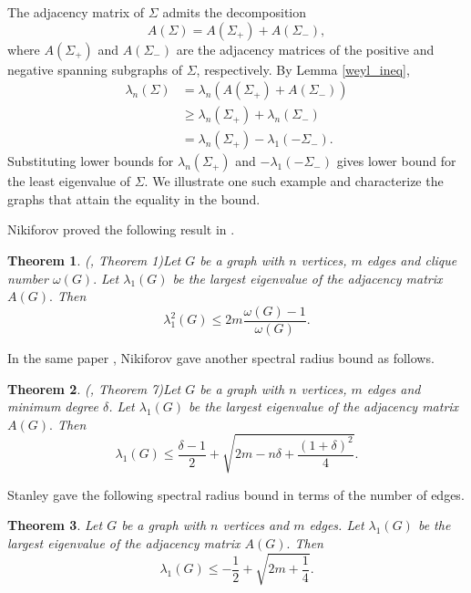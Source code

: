 \documentclass[12pt]{article}
\theoremstyle{plain}
\newtheorem{theorem}{Theorem}[section]
\numberwithin{equation}{section}
\begin{document}
	The adjacency matrix of $\Sigma$ admits the decomposition
	\[
	A(\Sigma)=A(\Sigma_{+})+A(\Sigma_{-}),
	\]
	where $A(\Sigma_{+})$ and $A(\Sigma_{-})$ are the adjacency matrices of the positive and negative spanning subgraphs of $\Sigma$, respectively.
	By Lemma \ref{weyl_ineq}, 
	\begin{align} \label{inequ_adj_one}
		\nonumber \lambda_{n}(\Sigma)&=\lambda_{n}(A(\Sigma_{+})+A(\Sigma_{-}))\\
		\nonumber   &\geq \lambda_{n}(\Sigma_{+})+\lambda_{n}(\Sigma_{-}) \\
		&= \lambda_{n}(\Sigma_{+})-\lambda_{1}(-\Sigma_{-}).
	\end{align}
	Substituting lower bounds for $\lambda_n(\Sigma_+)$ and $-\lambda_1(-\Sigma_-)$ gives lower bound for the least eigenvalue of $\Sigma$. We illustrate one such example and characterize the graphs that attain the equality in the bound.
	
	Nikiforov proved the following result in \cite{nikiforov2002some}.
	\begin{theorem}\emph{(\cite{nikiforov2002some}, Theorem 1)}\label{Niki_largest}
		Let $G$ be a graph with $n$ vertices, $m$ edges and clique number $\omega(G).$ Let $\lambda_{1}(G)$ be the largest eigenvalue of the adjacency matrix $A(G).$ Then \[\lambda_{1}^{2}(G)\leq 2m \frac{\omega(G)-1}{\omega(G)}.\]
	\end{theorem}
	In the same paper \cite{nikiforov2002some}, Nikiforov gave another spectral radius bound as follows.
	\begin{theorem}\emph{(\cite{nikiforov2002some}, Theorem 7)}\label{nikiforov_bound}
		Let $G$ be a graph with $n$ vertices, $m$ edges and minimum degree $\delta$. Let $\lambda_{1}(G)$ be the largest eigenvalue of the adjacency matrix $A(G).$ Then \[\lambda_{1}(G)\leq \frac{\delta-1}{2} + \sqrt{2m-n\delta+\frac{(1+\delta)^2}{4}}.\]
	\end{theorem}
	Stanley gave the following spectral radius bound \cite{stanley1987bound} in terms of the number of edges.
	\begin{theorem}\emph{\cite{stanley1987bound}}\label{stanley_bound}
		Let $G$ be a graph with $n$ vertices and $m$ edges. Let $\lambda_{1}(G)$ be the largest eigenvalue of the adjacency matrix $A(G).$ Then \[\lambda_{1}(G)\leq -\frac{1}{2} + \sqrt{2m+\frac{1}{4}}.\]
	\end{theorem}
	
\end{document}
